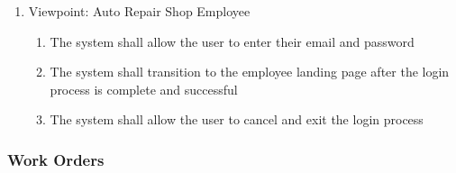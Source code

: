 \documentclass[12pt]{article}
\begin{document}
\begin{enumerate}[label=BE\arabic*., series=business_events]
\begin{enumerate}[VP\arabic*.]
		      \item Viewpoint: Auto Repair Shop Employee
		            \begin{enumerate}
			            \item The system shall allow the user to enter their email and password
			            \item The system shall transition to the employee landing page after the login process is complete and
			                  successful
			            \item The system shall allow the user to cancel and exit the login process
		            \end{enumerate}
	      \end{enumerate}
\end{enumerate}

\subsubsection{Work Orders}
\end{document}
